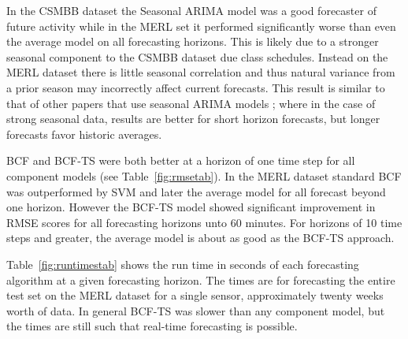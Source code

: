 \documentclass{acm_proc_article-sp}
\begin{document}
In the CSMBB dataset the Seasonal ARIMA model was a good forecaster of future activity while in the MERL set it performed significantly worse than even the average model on all forecasting horizons.  This is likely due to a stronger seasonal component to the CSMBB dataset due class schedules.  Instead on the MERL dataset there is little seasonal correlation and thus natural variance from a prior season may incorrectly affect current forecasts.  This result is similar to that of other papers that use seasonal ARIMA models \cite{Newsham2010}; where in the case of strong seasonal data, results are better for short horizon forecasts, but longer forecasts favor historic averages.

BCF and BCF-TS were both better at a horizon of one time step for all component models (see Table~\ref{fig:rmsetab}).  In the MERL dataset standard BCF was outperformed by SVM and later the average model for all forecast beyond one horizon.  However the BCF-TS model showed significant improvement in RMSE scores for all forecasting horizons unto 60 minutes.  For horizons of 10 time steps and greater, the average model is about as good as the BCF-TS approach.

Table~\ref{fig:runtimestab} shows the run time in seconds of each forecasting algorithm at a given forecasting horizon.  The times are for forecasting the entire test set on the MERL dataset for a single sensor, approximately twenty weeks worth of data.  In general BCF-TS was slower than any component model, but the times are still such that real-time forecasting is possible.
\end{document}
